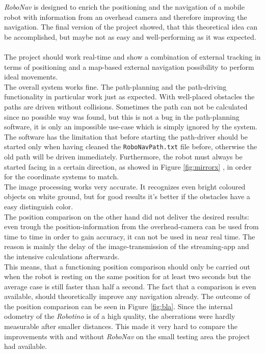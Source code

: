 \textit{RoboNav} is designed to enrich the positioning and the navigation of a mobile robot with information from an overhead camera and therefore improving the navigation. The final version of the project showed, that this theoretical idea can be accomplished, but maybe not as easy and well-performing as it was expected. \\ \\
The project should work real-time and show a combination of external tracking in terms of positioning and a map-based external navigation possibility to perform ideal movements. \\
The overall system works fine. The path-planning and the path-driving functionality in particular work just as expected. With well-placed obstacles the paths are driven without collisions. Sometimes the path can not be calculated since no possible way was found, but this is not a bug in the path-planning software, it is only an impossible use-case which is simply ignored by the system. The software has the limitation that before starting the path-driver should be started only when having cleaned the  \texttt{RoboNavPath.txt} file before, otherwise the old path will be driven immediately. Furthermore, the robot must always be started facing in a certain direction, as showed in Figure \ref{fig:mirrorx} , in order for the coordinate systems to match.\\ %
The image processing works very accurate. 
It recognizes even bright coloured objects on white ground, but for good results it's better if the obstacles have a easy distinguish color.
\\
The position comparison on the other hand did not deliver the desired results: even trough the position-information from the overhead-camera can be used from time to time in order to gain accuracy, it can not be used in near real time. The reason is mainly the delay of the image-transmission of the streaming-app and the intensive calculations afterwards. \\ This means, that a functioning position comparison should only be carried out when the robot is resting on the same position for at least two seconds but the average case is still faster than half a second. The fact that a comparison is even available, should theoretically improve any navigation already. The outcome of the position comparison can be seen in Figure \ref{fig:bla}. Since the internal odometry of the \textit{Robotino} is of a high quality, the aberrations were hardly measurable after smaller distances. This made it very hard to compare the improvements with and without \textit{RoboNav} on the small testing area the project had available.
